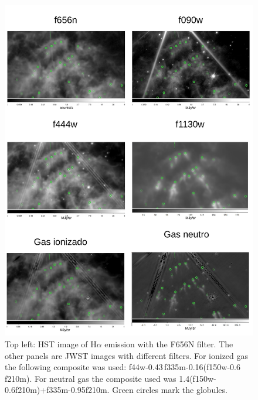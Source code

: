 \documentclass{book}
\begin{document}
\begin{figure}[htb]
    \centering
    \includegraphics[width=\textwidth]{imagenes_corregidas/Arreglo_04.pdf}
    \caption{Top left: HST image of H$\alpha$ emission with the F656N
      filter. The other panels are JWST images with different filters.
      For ionized gas the following composite was used:
      f44w-0.43\,f335m-0.16(f150w-0.6\,f210m). For neutral gas the
      composite used was
      1.4(f150w-0.6\;f210m)+f335m-0.95\;f210m. Green circles mark the
      globules.}
    \label{fig:filters WR124}
  \end{figure}
  
\end{document}
